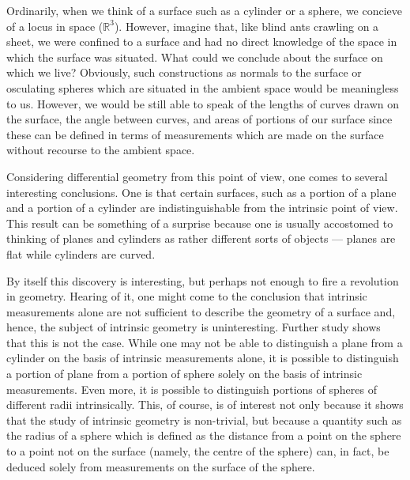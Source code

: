 \documentclass[12pt]{article}
\begin{document}
Ordinarily, when we think of a surface such as a cylinder or a sphere,
we concieve of a locus in space ($\mathbb{R}^3$).  However, imagine
that, like blind ants crawling on a sheet, we were confined to a
surface and had no direct knowledge of the space in which the surface
was situated.  What could we conclude about the surface on which we
live?  Obviously, such constructions as normals to the surface or
osculating spheres which are situated in the ambient space would be
meaningless to us.  However, we would be still able to speak of the
lengths of curves drawn on the surface, the angle between curves, and
areas of portions of our surface since these can be defined in terms
of measurements which are made on the surface without recourse to the
ambient space.

Considering differential geometry from this point of view, one comes
to several interesting conclusions.  One is that certain surfaces,
such as a portion of a plane and a portion of a cylinder are
indistinguishable from the intrinsic point of view.  This result can
be something of a surprise because one is usually accostomed to
thinking of planes and cylinders as rather different sorts of objects
--- planes are flat while cylinders are curved.

By itself this discovery is interesting, but perhaps not enough to
fire a revolution in geometry.  Hearing of it, one might come to the
conclusion that intrinsic measurements alone are not sufficient to
describe the geometry of a surface and, hence, the subject of
intrinsic geometry is uninteresting.  Further study shows that this is
not the case.  While one may not be able to distinguish a plane from a
cylinder on the basis of intrinsic measurements alone, it is possible
to distinguish a portion of plane from a portion of sphere solely on
the basis of intrinsic measurements.  Even more, it is possible to
distinguish portions of spheres of different radii intrinsically.
This, of course, is of interest not only because it shows that the
study of intrinsic geometry is non-trivial, but because a quantity
such as the radius of a sphere which is defined as the distance from a
point on the sphere to a point not on the surface (namely, the centre
of the sphere) can, in fact, be deduced solely from measurements on
the surface of the sphere.
\end{document}
